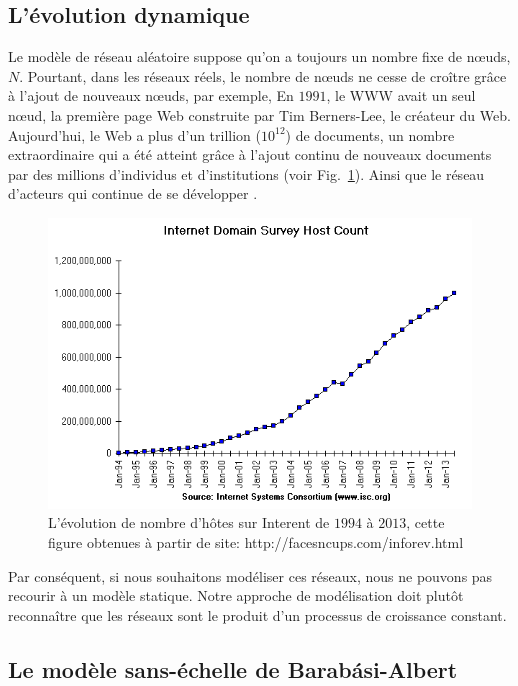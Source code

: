 \subsection{L'évolution dynamique}
Le modèle de réseau aléatoire suppose qu'on a toujours un nombre fixe de nœuds, $N$. Pourtant, dans les réseaux réels, le nombre de nœuds ne cesse de croître grâce à l'ajout de nouveaux nœuds, par exemple, En $1991$, le WWW avait un seul nœud, la première page Web construite par Tim Berners-Lee, le créateur du Web. Aujourd'hui, le Web a plus d'un trillion ($10^{12}$) de documents, un nombre extraordinaire qui a été atteint grâce à l'ajout continu de nouveaux documents par des millions d'individus et d'institutions (voir Fig.~\ref{hosts}). Ainsi que le réseau d'acteurs qui continue de se développer \cite{Barabasi2015}.
\begin{figure}[h]
	\centering
	\includegraphics[scale=0.5]{./figures/hosts}
	\caption{L'évolution de nombre d'hôtes sur Interent de $1994$ à $2013$, cette figure  obtenues à partir de site: http://facesncups.com/inforev.html}
	\label{hosts}
\end{figure}
Par conséquent, si nous souhaitons modéliser ces réseaux, nous ne pouvons pas recourir à un modèle statique. Notre approche de modélisation doit plutôt reconnaître que les réseaux sont le produit d'un processus de croissance constant.
\subsection{Le modèle sans-échelle de Barabási-Albert}

